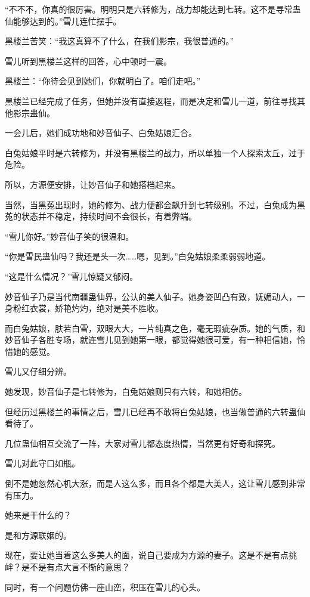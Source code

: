 \begin{this_body}
“不不不，你真的很厉害。明明只是六转修为，战力却能达到七转。这不是寻常蛊仙能够达到的。”雪儿连忙摆手。

黑楼兰苦笑：“我这真算不了什么，在我们影宗，我很普通的。”

雪儿听到黑楼兰这样的回答，心中顿时一震。

黑楼兰：“你待会见到她们，你就明白了。咱们走吧。”

黑楼兰已经完成了任务，但她并没有直接返程，而是决定和雪儿一道，前往寻找其他影宗蛊仙。

一会儿后，她们成功地和妙音仙子、白兔姑娘汇合。

白兔姑娘平时是六转修为，并没有黑楼兰的战力，所以单独一个人探索太丘，过于危险。

所以，方源便安排，让妙音仙子和她搭档起来。

当然，当黑菟出现时，她的修为、战力便都会飙升到七转级别。不过，白兔成为黑菟的状态并不稳定，持续时间不会很长，有着弊端。

“雪儿你好。”妙音仙子笑的很温和。

“你是雪民蛊仙吗？我还是头一次……嗯，见到。”白兔姑娘柔柔弱弱地道。

“这是什么情况？”雪儿惊疑又郁闷。

妙音仙子乃是当代南疆蛊仙界，公认的美人仙子。她身姿凹凸有致，妩媚动人，一身粉红衣裳，娇艳灼灼，绝对是美不胜收。

而白兔姑娘，肤若白雪，双眼大大，一片纯真之色，毫无瑕疵杂质。她的气质，和妙音仙子各胜专场，就连雪儿见到她第一眼，都觉得她很可爱，有一种相信她，怜惜她的感觉。

雪儿又仔细分辨。

她发现，妙音仙子是七转修为，白兔姑娘则只有六转，和她相仿。

但经历过黑楼兰的事情之后，雪儿已经再不敢将白兔姑娘，也当做普通的六转蛊仙看待了。

几位蛊仙相互交流了一阵，大家对雪儿都态度热情，当然更有好奇和探究。

雪儿对此守口如瓶。

倒不是她忽然心机大涨，而是人这么多，而且各个都是大美人，这让雪儿感到非常有压力。

她来是干什么的？

是和方源联姻的。

现在，要让她当着这么多美人的面，说自己要成为方源的妻子。这是不是有点挑衅？是不是有点大言不惭的意思？

同时，有一个问题仿佛一座山峦，积压在雪儿的心头。


\end{this_body}
